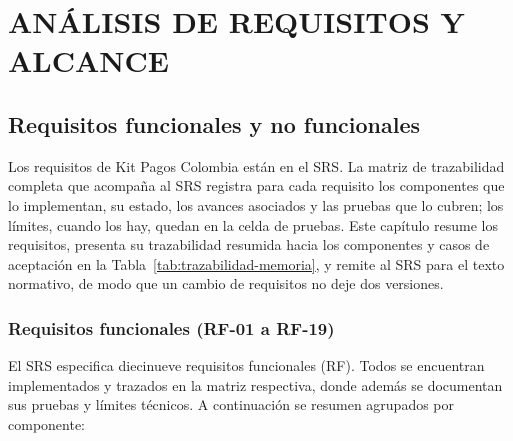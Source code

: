 \setcounter{subsection}{0}
\section{ANÁLISIS DE REQUISITOS Y ALCANCE}
\sloppy

\subsection{Requisitos funcionales y no funcionales}
Los requisitos de Kit Pagos Colombia están en el SRS. La matriz de trazabilidad completa que acompaña al SRS registra para cada requisito los componentes que lo implementan, su estado, los avances asociados y las pruebas que lo cubren; los límites, cuando los hay, quedan en la celda de pruebas. Este capítulo resume los requisitos, presenta su trazabilidad resumida hacia los componentes y casos de aceptación en la Tabla~\ref{tab:trazabilidad-memoria}, y remite al SRS para el texto normativo, de modo que un cambio de requisitos no deje dos versiones.

\subsubsection{Requisitos funcionales (RF-01 a RF-19)}
El SRS especifica diecinueve requisitos funcionales (RF). Todos se encuentran implementados y trazados en la matriz respectiva, donde además se documentan sus pruebas y límites técnicos. A continuación se resumen agrupados por componente:
